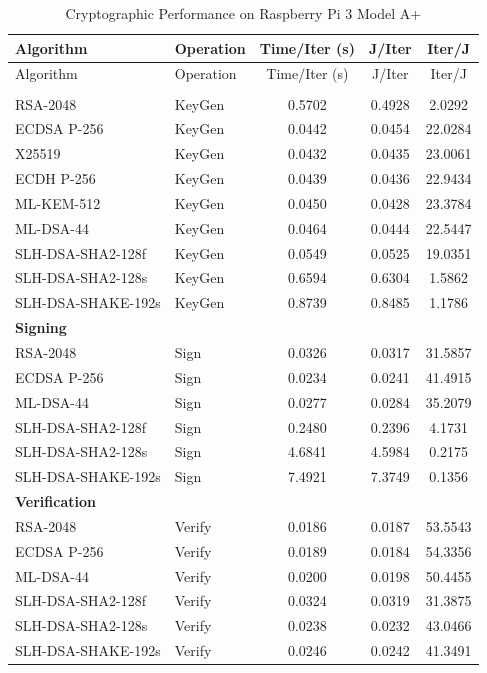 \documentclass[11pt, letterpaper]{article}
\begin{document}
\begin{longtable}{llccc}
\caption{Cryptographic Performance on Raspberry Pi 3 Model A+} \\
\hline
Algorithm & Operation & Time/Iter (s) & J/Iter & Iter/J \\
\hline
\endfirsthead

\hline
Algorithm & Operation & Time/Iter (s) & J/Iter & Iter/J \\
\hline
\endhead

\hline
\endfoot

\hline
\endlastfoot

\multicolumn{5}{l}{\textbf{Key Generation}} \\

RSA-2048 & KeyGen & 0.5702 & 0.4928 & 2.0292 \\
ECDSA P-256 & KeyGen & 0.0442 & 0.0454 & 22.0284 \\
X25519 & KeyGen & 0.0432 & 0.0435 & 23.0061 \\
ECDH P-256 & KeyGen & 0.0439 & 0.0436 & 22.9434 \\
ML-KEM-512 & KeyGen & 0.0450 & 0.0428 & 23.3784 \\
ML-DSA-44 & KeyGen & 0.0464 & 0.0444 & 22.5447 \\
SLH-DSA-SHA2-128f & KeyGen & 0.0549 & 0.0525 & 19.0351 \\
SLH-DSA-SHA2-128s & KeyGen & 0.6594 & 0.6304 & 1.5862 \\
SLH-DSA-SHAKE-192s & KeyGen & 0.8739 & 0.8485 & 1.1786 \\

\multicolumn{5}{l}{\textbf{Signing}} \\

RSA-2048 & Sign & 0.0326 & 0.0317 & 31.5857 \\
ECDSA P-256 & Sign & 0.0234 & 0.0241 & 41.4915 \\
ML-DSA-44 & Sign & 0.0277 & 0.0284 & 35.2079 \\
SLH-DSA-SHA2-128f & Sign & 0.2480 & 0.2396 & 4.1731 \\
SLH-DSA-SHA2-128s & Sign & 4.6841 & 4.5984 & 0.2175 \\
SLH-DSA-SHAKE-192s & Sign & 7.4921 & 7.3749 & 0.1356 \\

\multicolumn{5}{l}{\textbf{Verification}} \\

RSA-2048 & Verify & 0.0186 & 0.0187 & 53.5543 \\
ECDSA P-256 & Verify & 0.0189 & 0.0184 & 54.3356 \\
ML-DSA-44 & Verify & 0.0200 & 0.0198 & 50.4455 \\
SLH-DSA-SHA2-128f & Verify & 0.0324 & 0.0319 & 31.3875 \\
SLH-DSA-SHA2-128s & Verify & 0.0238 & 0.0232 & 43.0466 \\
SLH-DSA-SHAKE-192s & Verify & 0.0246 & 0.0242 & 41.3491 \\

\end{longtable}
\end{document}
